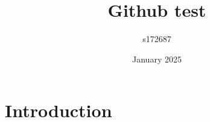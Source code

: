\documentclass{article}
\title{Github test}
\author{s172687 }
\date{January 2025}
\begin{document}
\maketitle

\section{Introduction}
\end{document}
